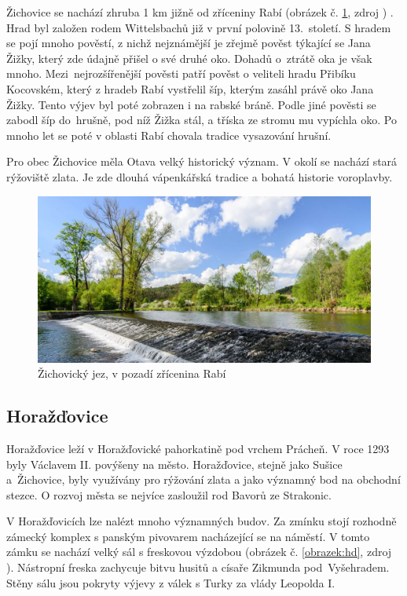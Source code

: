 \documentclass[thesis=M,czech]{FITthesis}[2012/06/26]
\begin{document}
Žichovice se nachází zhruba 1 km jižně od zříceniny Rabí (obrázek č. \ref{obrazek:zichovice}, zdroj \cite{rabi_foto}) . Hrad byl založen rodem Wittelsbachů již v první polovině 13.~století. S hradem se pojí mnoho pověstí, z nichž nejznámější je zřejmě pověst týkající se Jana Žižky, který zde údajně přišel o své druhé oko. Dohadů o~ztrátě oka je však mnoho. Mezi~nejrozšířenější pověsti patří pověst o veliteli hradu Přibíku Kocovském, který z hradeb Rabí vystřelil šíp, kterým zasáhl právě oko Jana Žižky. Tento výjev byl poté zobrazen i na rabské bráně. Podle jiné pověsti se zabodl šíp do~hrušně, pod níž Žižka stál, a tříska ze stromu mu vypíchla oko. Po mnoho let se poté v oblasti Rabí chovala tradice vysazování hrušní. \cite{rabi}

Pro obec Žichovice měla Otava velký historický význam. V okolí se nachází stará rýžoviště zlata. Je zde dlouhá vápenkářská tradice a bohatá historie voroplavby.

\begin{figure}[h!]
	\centering
	\includegraphics[width=12cm]{pics/zichovice.jpg}
	\caption{Žichovický jez, v pozadí zřícenina Rabí}
	\label{obrazek:zichovice}
\end{figure}

\subsection{Horažďovice}
Horažďovice leží v Horažďovické pahorkatině pod vrchem Prácheň. V roce 1293 byly Václavem II. povýšeny na město. Horažďovice, stejně jako Sušice a~Žichovice, byly využívány pro rýžování zlata a jako významný bod na obchodní stezce. O rozvoj města se nejvíce zasloužil rod Bavorů ze Strakonic. 

V Horažďovicích lze nalézt mnoho významných budov. Za zmínku stojí rozhodně zámecký komplex s panským pivovarem nacházející se na náměstí. V tomto zámku se nachází velký sál s freskovou výzdobou  (obrázek č. \ref{obrazek:hd}, zdroj \cite{hd}). Nástropní freska zachycuje bitvu husitů a císaře Zikmunda pod~Vyšehradem. Stěny sálu jsou pokryty výjevy z válek s Turky za vlády Leopolda I.  \cite{obce}\cite{hd}
\end{document}
